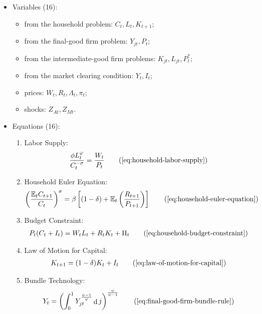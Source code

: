 \documentclass[
	12pt,
	]{article}
\numberwithin{equation}{section}
\DeclareMathOperator{\dif}{d}
\theoremstyle{definition}
\theoremstyle{plain}
\theoremstyle{plain}
\theoremstyle{plain}
\begin{document}
{\singlespacing
	
\begin{itemize}
	\item Variables (16):

\begin{itemize}
	\item from the household problem: $C_t, L_t, K_{t+1}$;
	\item from the final-good firm problem: $Y_{jt}, P_t$;
	\item from the intermediate-good firm problems: $K_{jt}, L_{jt}, P_t^\ast$;
	\item from the market clearing condition: $Y_t, I_t$;
	\item prices: $W_t, R_t, \Lambda_t, \pi_t$;
	\item shocks: $Z_{At}, Z_{Mt}$.
\end{itemize}
	\item Equations (16):

\begin{enumerate}
	\item Labor Supply:
	\begin{align}
		\frac{\phi L_t^{\varphi}}{C_t^{-\sigma}} = \frac{W_t}{P_t}
		\tag{\ref{eq:household-labor-supply}}
	\end{align}
		
	\item Household Euler Equation:
	\begin{align}
		\left( \frac{\mathbb{E}_t C_{t+1}}{C_t} \right)^\sigma = \beta \left[ (1-\delta) + \mathbb{E}_t \left(\frac{R_{t+1}}{P_{t+1}}\right) \right]
		\tag{\ref{eq:household-euler-equation}}
	\end{align}
		
	\item Budget Constraint: 
	\begin{align}
		P_t (C_t + I_t) = W_t L_t + R_t K_t + \Pi_t
		\tag{\ref{eq:household-budget-constraint}}
	\end{align}
		
	\item Law of Motion for Capital:
	\begin{align}
		K_{t+1} = (1-\delta)K_t + I_t
		\tag{\ref{eq:law-of-motion-for-capital}}
	\end{align}
			
	\item Bundle Technology:
	\begin{align}
		Y_t = \left( \int_{0}^{1} Y_{jt}^{\frac{\psi-1}{\psi}} \dif j \right)^{\frac{\psi}{\psi-1}}
		\tag{\ref{eq:final-good-firm-bundle-rule}}
	\end{align}
	

\end{enumerate}
\end{itemize}}
\end{document}
